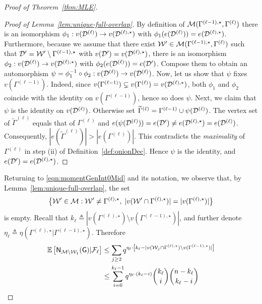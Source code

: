 \documentclass[12pt]{article}
\newcommand{\bE}{\mathbb{E}}
\newcommand{\calD}{{\cal D}}
\newcommand{\calF}{{\cal F}}
\newcommand{\calM}{{\cal M}}
\newcommand{\calW}{{\cal W}}
\newcommand{\pp}[1]{\left[#1\right]}
\newcommand{\s}[1]{\mathsf{#1}}
\begin{document}
\begin{proof}[Proof of Theorem~\ref{thm:MLE}]
\begin{proof}[Proof of Lemma~\ref{lem:unique-full-overlap}]
By definition of $\calM({\Gamma}^{(\ell-1),\star},\Gamma^{(\ell)})$ there is an isomorphism $\phi_1: v(\calD^{(\ell)})\to v(\calD^{(\ell),\star})$ with $\phi_1(e(\calD^{(\ell)}))=e(\calD^{(\ell),\star})$. Furthermore, because we assume that there exist $\calW'\in\calM({\Gamma}^{(\ell-1),\star},\Gamma^{(\ell)})$ such that $\calD'=\calW'\setminus{\Gamma}^{(\ell-1),\star}$ with $v(\calD')=v(\calD^{(\ell),\star})$, there is an isomorphism
$\phi_2:v(\calD^{(\ell)}) \to v(\calD^{(\ell),\star})$ with $\phi_2(e(\calD^{(\ell)}))=e(\calD')$.
Compose them to obtain an automorphism $\psi = \phi_1^{-1}\circ\phi_2:v(\calD^{(\ell)})\to v(\calD^{(\ell)})$. 
Now, let us show that $\psi$ fixes $v(\Gamma^{(\ell-1)})$. Indeed, since
$v(\Gamma^{(\ell-1)})\subsetneq v(\Gamma^{(\ell)})=v(\calD^{(\ell),\star})$, both $\phi_1$ and $\phi_2$ coincide with the identity on $v(\Gamma^{(\ell-1)})$, hence so does $\psi$. Next, we claim that $\psi$ is the identity on $v(\calD^{(\ell)})$. Otherwise set $\widetilde{\Gamma}^{(\ell)}=\Gamma^{(\ell-1)}\cup\psi(\calD^{(\ell)})$. The vertex set of $\widetilde{\Gamma}^{(\ell)}$ equals that of
$\Gamma^{(\ell)}$ and $e(\psi(\calD^{(\ell)})) = e(\calD')\neq e(\calD^{(\ell),\star}) =e(\calD^{(\ell)})$. Consequently, $|e(\widetilde{\Gamma}^{(\ell)})|>|e(\Gamma^{(\ell)})|$. This contradicts the \emph{maximality} of $\Gamma^{(\ell)}$ in step (ii) of Definition~\ref{def:onionDec}. Hence $\psi$ is the identity, and
$e(\calD')=e(\calD^{(\ell),\star})$.
\end{proof}
Returning to \eqref{eqn:momentGenInt0Mid} and its notation, we observe that, by Lemma~\ref{lem:unique-full-overlap}, the set
\begin{align}
\bigl\{\calW'\in\calM: \calW'\neq\Gamma^{(\ell),\star},\;|v(\calW'\cap\Gamma^{(\ell),\star})|=|v(\Gamma^{(\ell),\star})|\bigr\}
\end{align}
is empty. Recall that $k_\ell\triangleq |v(\Gamma^{(\ell),\star}) \setminus v(\Gamma^{(\ell-1),\star})|$, and further denote $\eta_\ell\triangleq\eta(\Gamma^{(\ell),\star} \vert \Gamma^{(\ell-1),\star})$. Therefore
\begin{align}
    \bE\pp{\s{N}_{\calM\setminus\calW_1}(\s{G})\vert\calF_\ell}&\leq \sum_{j\geq2}q^{\eta_\ell\cdot\pp{k_\ell-|v(\calW_j\cap\Gamma^{(\ell),\star})\setminus v(\Gamma^{(\ell-1),\star})|}}\label{eqn:samePP0}\\
    &\leq\sum_{i=0}^{k_\ell-1}q^{\eta_\ell\cdot(k_\ell-i)}\binom{k_\ell}{i}\binom{n-k_\ell}{k_\ell-i}\\

\end{align}
\end{proof}
\end{document}
